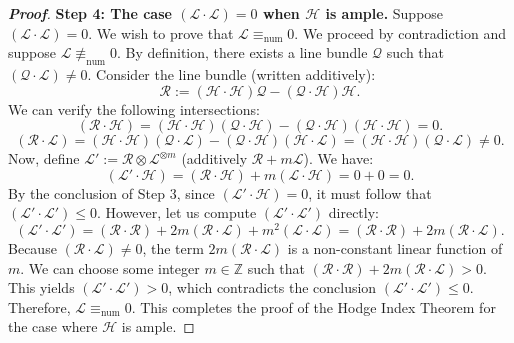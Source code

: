 \begin{proof}[\textbf{Proof}]
\textbf{Step 4: The case $(\mathcal{L} \cdot \mathcal{L}) = 0$ when $\mathcal{H}$ is ample.}
Suppose $(\mathcal{L} \cdot \mathcal{L}) = 0$. We wish to prove that $\mathcal{L} \equiv_{\text{num}} 0$.
We proceed by contradiction and suppose $\mathcal{L} \not\equiv_{\text{num}} 0$. By definition, there exists a line bundle $\mathcal{Q}$ such that $(\mathcal{Q} \cdot \mathcal{L}) \neq 0$.
Consider the line bundle (written additively):
\[
\mathcal{R} := (\mathcal{H} \cdot \mathcal{H})\mathcal{Q} - (\mathcal{Q} \cdot \mathcal{H})\mathcal{H}.
\]
We can verify the following intersections:
\[
(\mathcal{R} \cdot \mathcal{H}) = (\mathcal{H} \cdot \mathcal{H})(\mathcal{Q} \cdot \mathcal{H}) - (\mathcal{Q} \cdot \mathcal{H})(\mathcal{H} \cdot \mathcal{H}) = 0.
\]
\[
(\mathcal{R} \cdot \mathcal{L}) = (\mathcal{H} \cdot \mathcal{H})(\mathcal{Q} \cdot \mathcal{L}) - (\mathcal{Q} \cdot \mathcal{H})(\mathcal{H} \cdot \mathcal{L}) = (\mathcal{H} \cdot \mathcal{H})(\mathcal{Q} \cdot \mathcal{L}) \neq 0.
\]
Now, define $\mathcal{L}' := \mathcal{R} \otimes \mathcal{L}^{\otimes m}$ (additively $\mathcal{R} + m\mathcal{L}$). We have:
\[
(\mathcal{L}' \cdot \mathcal{H}) = (\mathcal{R} \cdot \mathcal{H}) + m(\mathcal{L} \cdot \mathcal{H}) = 0 + 0 = 0.
\]
By the conclusion of Step 3, since $(\mathcal{L}' \cdot \mathcal{H}) = 0$, it must follow that $(\mathcal{L}' \cdot \mathcal{L}') \leq 0$.
However, let us compute $(\mathcal{L}' \cdot \mathcal{L}')$ directly:
\[
(\mathcal{L}' \cdot \mathcal{L}') = (\mathcal{R} \cdot \mathcal{R}) + 2m(\mathcal{R} \cdot \mathcal{L}) + m^2(\mathcal{L} \cdot \mathcal{L}) = (\mathcal{R} \cdot \mathcal{R}) + 2m(\mathcal{R} \cdot \mathcal{L}).
\]
Because $(\mathcal{R} \cdot \mathcal{L}) \neq 0$, the term $2m(\mathcal{R} \cdot \mathcal{L})$ is a non-constant linear function of $m$. We can choose some integer $m \in \mathbb{Z}$ such that $(\mathcal{R} \cdot \mathcal{R}) + 2m(\mathcal{R} \cdot \mathcal{L}) > 0$.
This yields $(\mathcal{L}' \cdot \mathcal{L}') > 0$, which contradicts the conclusion $(\mathcal{L}' \cdot \mathcal{L}') \leq 0$.
Therefore, $\mathcal{L} \equiv_{\text{num}} 0$. This completes the proof of the Hodge Index Theorem for the case where $\mathcal{H}$ is ample.


\end{proof}
